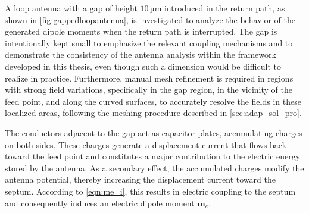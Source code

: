A loop antenna with a gap of height $10\,$µm introduced in the return path, as shown in \autoref{fig:gappedloopantenna}, is investigated to analyze the behavior of the generated dipole moments when the return path is interrupted. The gap is intentionally kept small to emphasize the relevant coupling mechanisms and to demonstrate the consistency of the antenna analysis within the framework developed in this thesis, even though such a dimension would be difficult to realize in practice. Furthermore, manual mesh refinement is required in regions with strong field variations, specifically in the gap region, in the vicinity of the feed point, and along the curved surfaces, to accurately resolve the fields in these localized areas, following the meshing procedure described in \autoref{sec:adap_sol_pro}.

%


The conductors adjacent to the gap act as capacitor plates, accumulating charges on both sides. These charges generate a displacement current that flows back toward the feed point and constitutes a major contribution to the electric energy stored by the antenna. As a secondary effect, the accumulated charges modify the antenna potential, thereby increasing the displacement current toward the septum. According to \eqref{eqn:me_i}, this results in electric coupling to the septum and consequently induces an electric dipole moment $\mathbf{m}_e$.

